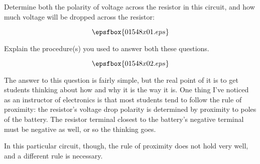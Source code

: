 

Determine both the polarity of voltage across the resistor in this circuit, and how much voltage will be dropped across the resistor:

$$\epsfbox{01548x01.eps}$$

Explain the procedure(s) you used to answer both these questions.







$$\epsfbox{01548x02.eps}$$







The answer to this question is fairly simple, but the real point of it is to get students thinking about how and why it is the way it is.  One thing I've noticed as an instructor of electronics is that most students tend to follow the rule of proximity: the resistor's voltage drop polarity is determined by proximity to poles of the battery.  The resistor terminal closest to the battery's negative terminal must be negative as well, or so the thinking goes.  

In this particular circuit, though, the rule of proximity does not hold very well, and a different rule is necessary.




